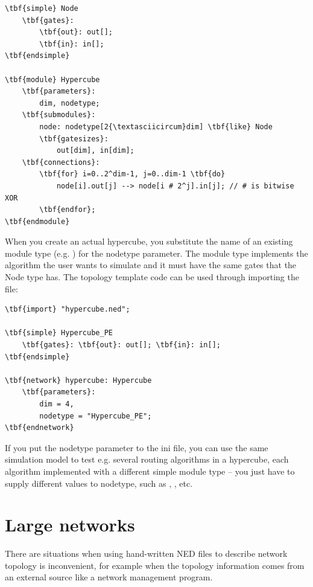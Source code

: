 \begin{Verbatim}[commandchars=\\\{\}]
\tbf{simple} Node
    \tbf{gates}:
        \tbf{out}: out[];
        \tbf{in}: in[];
\tbf{endsimple}

\tbf{module} Hypercube
    \tbf{parameters}:
        dim, nodetype;
    \tbf{submodules}:
        node: nodetype[2{\textasciicircum}dim] \tbf{like} Node
        \tbf{gatesizes}:
            out[dim], in[dim];
    \tbf{connections}:
        \tbf{for} i=0..2^dim-1, j=0..dim-1 \tbf{do}
            node[i].out[j] --> node[i # 2^j].in[j]; // # is bitwise XOR
        \tbf{endfor};
\tbf{endmodule}
\end{Verbatim}



When you create an actual hypercube, you substitute the name
of an existing module type (e.g. ) for the nodetype
parameter. The module type implements the algorithm the user
wants to simulate and it must have the same gates that the Node
type has. The topology template code can be used through importing
the file:


\begin{Verbatim}[commandchars=\\\{\}]
\tbf{import} "hypercube.ned";

\tbf{simple} Hypercube_PE
    \tbf{gates}: \tbf{out}: out[]; \tbf{in}: in[];
\tbf{endsimple}

\tbf{network} hypercube: Hypercube
    \tbf{parameters}:
        dim = 4,
        nodetype = "Hypercube_PE";
\tbf{endnetwork}
\end{Verbatim}



If you put the nodetype parameter to the ini file, you can use the
same simulation model to test e.g. several routing algorithms in a
hypercube, each algorithm implemented with a different
simple module type -- you just have to supply
different values to nodetype, such as ,
, etc.



\section{Large networks}

There are situations when using hand-written NED files to describe
network topology is inconvenient, for example when
the topology information comes from
an external source like
a network management program.

